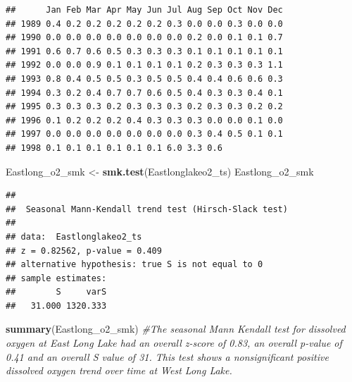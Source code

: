 \documentclass[12pt,]{article}
\newenvironment{Shaded}{\begin{snugshade}}{\end{snugshade}}
\newcommand{\KeywordTok}[1]{\textcolor[rgb]{0.13,0.29,0.53}{\textbf{#1}}}
\newcommand{\DataTypeTok}[1]{\textcolor[rgb]{0.13,0.29,0.53}{#1}}
\newcommand{\DecValTok}[1]{\textcolor[rgb]{0.00,0.00,0.81}{#1}}
\newcommand{\StringTok}[1]{\textcolor[rgb]{0.31,0.60,0.02}{#1}}
\newcommand{\CommentTok}[1]{\textcolor[rgb]{0.56,0.35,0.01}{\textit{#1}}}
\newcommand{\OperatorTok}[1]{\textcolor[rgb]{0.81,0.36,0.00}{\textbf{#1}}}
\newcommand{\NormalTok}[1]{#1}
\begin{document}
\begin{Shaded}
\end{Shaded}

\begin{verbatim}
##      Jan Feb Mar Apr May Jun Jul Aug Sep Oct Nov Dec
## 1989 0.4 0.2 0.2 0.2 0.2 0.2 0.3 0.0 0.0 0.3 0.0 0.0
## 1990 0.0 0.0 0.0 0.0 0.0 0.0 0.0 0.2 0.0 0.1 0.1 0.7
## 1991 0.6 0.7 0.6 0.5 0.3 0.3 0.3 0.1 0.1 0.1 0.1 0.1
## 1992 0.0 0.0 0.9 0.1 0.1 0.1 0.1 0.2 0.3 0.3 0.3 1.1
## 1993 0.8 0.4 0.5 0.5 0.3 0.5 0.5 0.4 0.4 0.6 0.6 0.3
## 1994 0.3 0.2 0.4 0.7 0.7 0.6 0.5 0.4 0.3 0.3 0.4 0.1
## 1995 0.3 0.3 0.3 0.2 0.3 0.3 0.3 0.2 0.3 0.3 0.2 0.2
## 1996 0.1 0.2 0.2 0.2 0.4 0.3 0.3 0.3 0.0 0.0 0.1 0.0
## 1997 0.0 0.0 0.0 0.0 0.0 0.0 0.0 0.3 0.4 0.5 0.1 0.1
## 1998 0.1 0.1 0.1 0.1 0.1 0.1 6.0 3.3 0.6
\end{verbatim}

\begin{Shaded}
\begin{Highlighting}[]
\NormalTok{Eastlong_o2_smk <-}\StringTok{ }\KeywordTok{smk.test}\NormalTok{(Eastlonglakeo2_ts)}
\NormalTok{Eastlong_o2_smk}
\end{Highlighting}
\end{Shaded}

\begin{verbatim}
## 
##  Seasonal Mann-Kendall trend test (Hirsch-Slack test)
## 
## data:  Eastlonglakeo2_ts
## z = 0.82562, p-value = 0.409
## alternative hypothesis: true S is not equal to 0
## sample estimates:
##        S     varS 
##   31.000 1320.333
\end{verbatim}

\begin{Shaded}
\begin{Highlighting}[]
\KeywordTok{summary}\NormalTok{(Eastlong_o2_smk) }\CommentTok{#The seasonal Mann Kendall test for dissolved oxygen at East Long Lake had an overall z-score of 0.83, an overall p-value of 0.41 and an overall S value of 31. This test shows a nonsignificant positive dissolved oxygen trend over time at West Long Lake.}
\end{Highlighting}
\end{Shaded}
\end{document}
